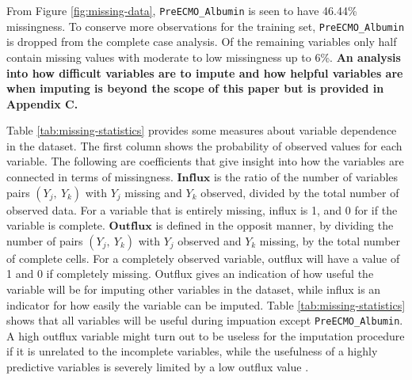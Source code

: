 \documentclass[12pt,]{article}
\begin{document}
From Figure \ref{fig:missing-data}, \texttt{PreECMO\_Albumin} is seen to
have 46.44\% missingness. To conserve more observations for the training
set, \texttt{PreECMO\_Albumin} is dropped from the complete case
analysis. Of the remaining variables only half contain missing values
with moderate to low missingness up to 6\%. \textbf{An analysis into how
difficult variables are to impute and how helpful variables are when
imputing is beyond the scope of this paper but is provided in Appendix
C.}

Table \ref{tab:missing-statistics} provides some measures about variable
dependence in the dataset. The first column shows the probability of
observed values for each variable. The following are coefficients that
give insight into how the variables are connected in terms of
missingness. \(\mathbf{Influx}\) is the ratio of the number of variables
pairs \((Y_j, ~Y_k)\) with \(Y_j\) missing and \(Y_k\) observed, divided
by the total number of observed data. For a variable that is entirely
missing, influx is 1, and 0 for if the variable is complete.
\(\mathbf{Outflux}\) is defined in the opposit manner, by dividing the
number of pairs \((Y_j, ~Y_k)\) with \(Y_j\) observed and \(Y_k\)
missing, by the total number of complete cells. For a completely
observed variable, outflux will have a value of 1 and 0 if completely
missing. Outflux gives an indication of how useful the variable will be
for imputing other variables in the dataset, while influx is an
indicator for how easily the variable can be imputed. Table
\ref{tab:missing-statistics} shows that all variables will be useful
during impuation except \texttt{PreECMO\_Albumin}. A high outflux
variable might turn out to be useless for the imputation procedure if it
is unrelated to the incomplete variables, while the usefulness of a
highly predictive variables is severely limited by a low outflux value
\autocite*{van_buuren_flexible_2012}.
\end{document}
